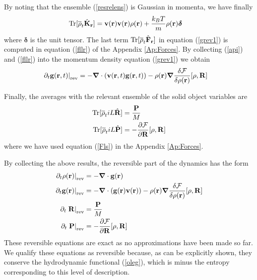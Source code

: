 \documentclass[b5paper,openright,10pt]{book}
\begin{document}
By noting that the ensemble (\ref{resrelens}) is Gaussian in momenta, we have finally 
\begin{align}
  {\rm Tr}[\overline{\rho}_t \hat{{\bf K}}_{\bf r}] &=
{\bf v}({\bf r}){\bf v}({\bf r}){\rho}({\bf r})+\frac{k_BT}{m}\rho({\bf r})\boldsymbol{\delta}
\label{api}
\end{align}
where $\boldsymbol{\delta}$ is the unit  tensor.  The last term $ {\rm
  Tr}[\overline{\rho}_t \hat{\bf F}_{\bf r}]$  in equation (\ref{grev1}) is
computed  in   equation  (\ref{fllr})  of  the   Appendix \ref{Ap:Forces}.   By  collecting
(\ref{api})  and  (\ref{fllr})  into  the  momentum  density  equation
(\ref{grev1}) we obtain
\begin{align}
\left.\partial_t {\bf g}({\bf r},t)\right|_{\rm rev} 
&=-\boldsymbol{\nabla}\cdot\left({\bf v}({\bf r},t)  {\bf g}({\bf r},t)  \right)
-\rho({\bf r})\boldsymbol{\nabla}
\frac{\delta {\cal F}}{\delta\rho({\bf r})}[\rho,{\bf R}]
\label{grev}
\end{align}

Finally, the averages with the relevant ensemble of the solid object variables are
\begin{align}
{\rm Tr}[\overline{\rho}_t  iL\hat{\bf R}] 
&=\frac{\bf P}{M}
\nonumber\\
{\rm Tr}[\overline{\rho}_t  iL\hat{\bf P}] 
&=-\frac{\partial {\cal F}}{\partial {\bf R}}[\rho,{\bf R}]
\end{align}
where we have used equation (\ref{Fls}) in the Appendix \ref{Ap:Forces}.

By collecting the  above results, the reversible part  of the dynamics
has the form
\begin{align}
\left.  \partial_t\rho({\bf r})\right|_{\rm rev}&=-\boldsymbol{\nabla}\cdot{\bf g}({\bf r})
\nonumber\\
\left.  \partial_t{\bf g}({\bf r})\right|_{\rm rev}&=-\boldsymbol{\nabla}\cdot\left({\bf g}({\bf r}){\bf v}({\bf r})\right)
-\rho({\bf r})\boldsymbol{\nabla} \frac{\delta {\cal F}}{\delta\rho({\bf r})}[\rho,{\bf R}]
\nonumber\\
\partial_t\left. {\bf R}\right|_{\rm rev}&=\frac{\bf P}{M}
\nonumber\\
\partial_t\left.{\bf P}\right|_{\rm rev}&=-\frac{\partial {\cal F}}{\partial {\bf R}}[\rho,{\bf R}]
\label{rev}
\end{align}
These reversible  equations are exact  as no approximations  have been
made so far. We qualify these  equations as reversible because, as can
be  explicitly  shown,  they   conserve  the  hydrodynamic  functional
(\ref{oleg}), which  is minus the entropy corresponding
  to this level of description.
\end{document}
